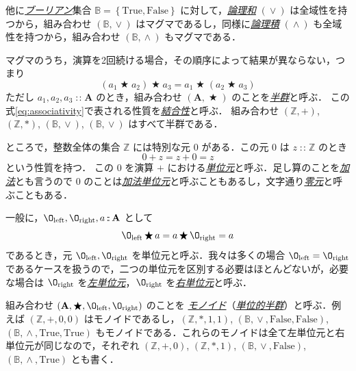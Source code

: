 \documentclass[a4paper]{jsbook}
\newcommand{\keyword}[1]{{\underline{\emph{#1}}}}
\newcommand{\mSpecialConst}[1]{\mathrm{#1}} %
\newcommand{\mTrue}{\mSpecialConst{True}}
\newcommand{\mFalse}{\mSpecialConst{False}}
\newcommand{\mZero}{\O}
\newcommand{\mSpecialSub}[1]{\text{#1}}
\newcommand{\mLeft}{\mSpecialSub{left}}
\newcommand{\mRight}{\mSpecialSub{right}}
\newcommand{\mSet}[1]{\mathbf{#1}}
\newcommand{\mSpecialSet}[1]{\mathbb{#1}} %
\newcommand{\mZSet}{\mSpecialSet{Z}}
\newcommand{\mBSet}{\mSpecialSet{B}}
\newcommand{\mSetWith}[1]{\left\{#1\right\}}
\newcommand{\mTupleWith}[1]{\left(#1\right)}
\DeclareMathOperator{\mIn}{{:\!:}}
\DeclareMathOperator{\mBinOp}{\bigstar}
\DeclareMathOperator{\mLogicalAnd}{\wedge}
\DeclareMathOperator{\mLogicalOr}{\vee}
\newcommand{\mathSet}[1]{\mathbf{#1}} %
\begin{document}
他に\keyword{ブーリアン}集合 $\mBSet=\mSetWith{\mTrue,\mFalse}$ に対して，\keyword{論理和} $(\mLogicalOr)$ は全域性を持つから，組み合わせ $\mTupleWith{\mBSet,\mLogicalOr}$ はマグマであるし，同様に\keyword{論理積} $(\mLogicalAnd)$ も全域性を持つから，組み合わせ $\mTupleWith{\mBSet,\mLogicalAnd}$ もマグマである．

マグマのうち，演算を2回続ける場合，その順序によって結果が異ならない，つまり
\begin{equation}
\label{eq:associativity}
\left(a_1\mBinOp a_2\right)\mBinOp a_3
=a_1\mBinOp\left(a_2\mBinOp{a_3}\right)
\end{equation}
ただし $a_1,a_2,a_3\mIn\mSet{A}$ のとき，組み合わせ $\mTupleWith{\mathSet{A},\mBinOp}$ のことを\keyword{半群}と呼ぶ．
この式\eqref{eq:associativity}で表される性質を\keyword{結合性}と呼ぶ．
組み合わせ $\mTupleWith{\mZSet,+}$, $\mTupleWith{\mZSet,*}$, $\mTupleWith{\mBSet,\mLogicalOr}$, $\mTupleWith{\mBSet,\mLogicalOr}$ はすべて半群である．

ところで，整数全体の集合 $\mZSet$ には特別な元 $0$ がある．この元 $0$ は $z\mIn\mZSet$ のとき
\begin{equation}
0+z=z+0=z
\end{equation}
という性質を持つ．
この $0$ を演算 $+$ における\keyword{単位元}と呼ぶ．足し算のことを\keyword{加法}とも言うので $0$ のことは\keyword{加法単位元}と呼ぶこともあるし，文字通り\keyword{零元}と呼ぶこともある．

一般に，$\mZero_\mLeft,\mZero_\mRight,a\mIn\mSet{A}$ として
\begin{equation}
\label{eq:identity}
\mZero_\mLeft\mBinOp a=a\mBinOp\mZero_\mRight=a
\end{equation}
であるとき，元 $\mZero_\mLeft,\mZero_\mRight$ を単位元と呼ぶ．我々は多くの場合 $\mZero_\mLeft=\mZero_\mRight$ であるケースを扱うので，二つの単位元を区別する必要はほとんどないが，必要な場合は $\mZero_\mRight$ を\keyword{左単位元}，$\mZero_\mRight$ を\keyword{右単位元}と呼ぶ．

組み合わせ $\mTupleWith{\mSet{A},\mBinOp,\mZero_\mLeft,\mZero_\mRight}$ のことを
\keyword{モノイド}（\keyword{単位的半群}）と呼ぶ．例えば $\mTupleWith{\mZSet,+,0,0}$ はモノイドであるし，$\mTupleWith{\mZSet,*,1,1}$, $\mTupleWith{\mBSet,\mLogicalOr,\mFalse,\mFalse}$, $\mTupleWith{\mBSet,\mLogicalAnd,\mTrue,\mTrue}$ もモノイドである．これらのモノイドは全て左単位元と右単位元が同じなので，それぞれ $\mTupleWith{\mZSet,+,0}$, $\mTupleWith{\mZSet,*,1}$, $\mTupleWith{\mBSet,\mLogicalOr,\mFalse}$, $\mTupleWith{\mBSet,\mLogicalAnd,\mTrue}$ とも書く．
\end{document}
